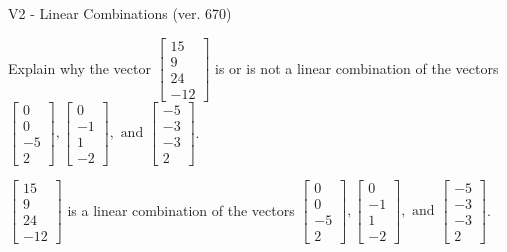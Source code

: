 \begin{exercise}
  \begin{exerciseTitle}V2 - Linear Combinations (ver. 670)\end{exerciseTitle}
  \begin{exerciseStatement}
    Explain why the vector \(\left[\begin{array}{c}
15 \\
9 \\
24 \\
-12
\end{array}\right]\)  is or is not a linear 
	combination of the vectors \(\left[\begin{array}{c}
0 \\
0 \\
-5 \\
2
\end{array}\right] , \left[\begin{array}{c}
0 \\
-1 \\
1 \\
-2
\end{array}\right] , \text{ and } \left[\begin{array}{c}
-5 \\
-3 \\
-3 \\
2
\end{array}\right]\).
	


  \end{exerciseStatement}
  \begin{exerciseAnswer}
   \(\left[\begin{array}{c}
15 \\
9 \\
24 \\
-12
\end{array}\right]\) 
  	 is  
	a linear combination of the vectors \(\left[\begin{array}{c}
0 \\
0 \\
-5 \\
2
\end{array}\right] , \left[\begin{array}{c}
0 \\
-1 \\
1 \\
-2
\end{array}\right] , \text{ and } \left[\begin{array}{c}
-5 \\
-3 \\
-3 \\
2
\end{array}\right]\).

	
  


  \end{exerciseAnswer}
\end{exercise}